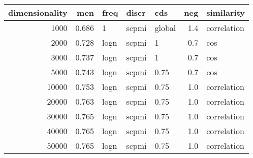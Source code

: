 \begin{tabular}{rrlllrl}
\toprule
 dimensionality &    men &  freq &  discr &     cds &  neg &   similarity \\
\midrule
           1000 &  0.686 &     1 &  scpmi &  global &  1.4 &  correlation \\
           2000 &  0.728 &  logn &  scpmi &       1 &  0.7 &          cos \\
           3000 &  0.737 &  logn &  scpmi &       1 &  0.7 &          cos \\
           5000 &  0.743 &  logn &  scpmi &    0.75 &  0.7 &          cos \\
          10000 &  0.753 &  logn &  scpmi &    0.75 &  1.0 &  correlation \\
          20000 &  0.763 &  logn &  scpmi &    0.75 &  1.0 &  correlation \\
          30000 &  0.765 &  logn &  scpmi &    0.75 &  1.0 &  correlation \\
          40000 &  0.765 &  logn &  scpmi &    0.75 &  1.0 &  correlation \\
          50000 &  0.765 &  logn &  scpmi &    0.75 &  1.0 &  correlation \\
\bottomrule
\end{tabular}
